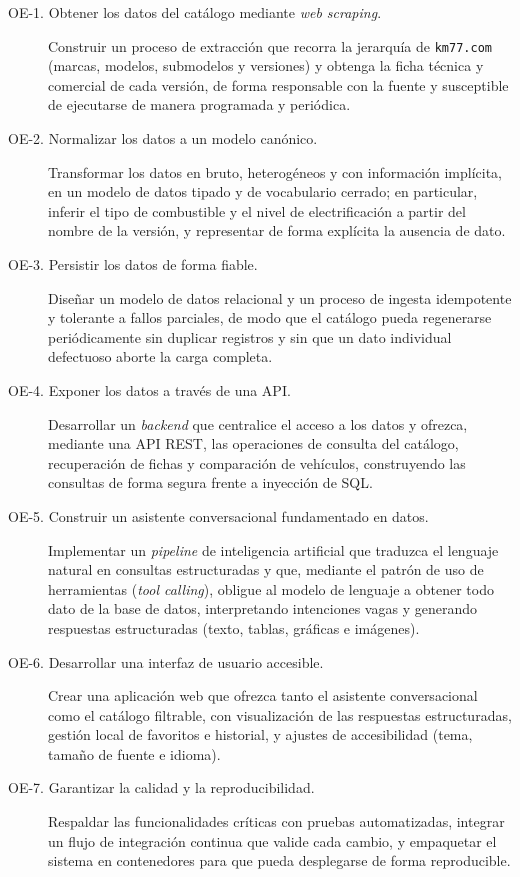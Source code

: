 \begin{description}
  \item[OE-1. Obtener los datos del catálogo mediante \emph{web scraping}.]
        Construir un proceso de extracción que recorra la jerarquía de
        \texttt{km77.com} (marcas, modelos, submodelos y versiones) y obtenga la
        ficha técnica y comercial de cada versión, de forma responsable con la
        fuente y susceptible de ejecutarse de manera programada y periódica.

  \item[OE-2. Normalizar los datos a un modelo canónico.] Transformar los datos
        en bruto, heterogéneos y con información implícita, en un modelo de datos
        tipado y de vocabulario cerrado; en particular, inferir el tipo de
        combustible y el nivel de electrificación a partir del nombre de la
        versión, y representar de forma explícita la ausencia de dato.

  \item[OE-3. Persistir los datos de forma fiable.] Diseñar un modelo de datos
        relacional y un proceso de ingesta idempotente y tolerante a fallos
        parciales, de modo que el catálogo pueda regenerarse periódicamente sin
        duplicar registros y sin que un dato individual defectuoso aborte la carga
        completa.

  \item[OE-4. Exponer los datos a través de una API.] Desarrollar un
        \emph{backend} que centralice el acceso a los datos y ofrezca, mediante una
        API REST, las operaciones de consulta del catálogo, recuperación de fichas
        y comparación de vehículos, construyendo las consultas de forma segura
        frente a inyección de SQL.

  \item[OE-5. Construir un asistente conversacional fundamentado en datos.]
        Implementar un \emph{pipeline} de inteligencia artificial que traduzca el
        lenguaje natural en consultas estructuradas y que, mediante el patrón de
        uso de herramientas (\emph{tool calling}), obligue al modelo de lenguaje a
        obtener todo dato de la base de datos, interpretando intenciones vagas y
        generando respuestas estructuradas (texto, tablas, gráficas e imágenes).

  \item[OE-6. Desarrollar una interfaz de usuario accesible.] Crear una
        aplicación web que ofrezca tanto el asistente conversacional como el
        catálogo filtrable, con visualización de las respuestas estructuradas,
        gestión local de favoritos e historial, y ajustes de accesibilidad (tema,
        tamaño de fuente e idioma).

  \item[OE-7. Garantizar la calidad y la reproducibilidad.] Respaldar las
        funcionalidades críticas con pruebas automatizadas, integrar un flujo de
        integración continua que valide cada cambio, y empaquetar el sistema en
        contenedores para que pueda desplegarse de forma reproducible.
\end{description}

